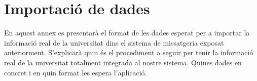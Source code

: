 \chapter{Importació de dades}\label{importacio}


En aquest annex es presentarà el format de les dades esperat per a importar la informació real de la universitat dins el sistema de missatgeria exposat anteriorment. S'explicarà quin és el procediment a seguir per tenir la informació real de la universitat totalment integrada al nostre sistema. Quines dades en concret i en quin format les espera l'aplicació.